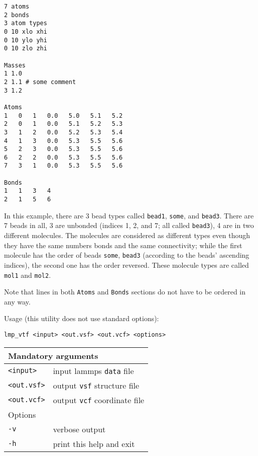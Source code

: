 \begin{verbatim}
7 atoms
2 bonds
3 atom types
0 10 xlo xhi
0 10 ylo yhi
0 10 zlo zhi

Masses
1 1.0
2 1.1 # some comment
3 1.2

Atoms
1   0   1   0.0   5.0   5.1   5.2
2   0   1   0.0   5.1   5.2   5.3
3   1   2   0.0   5.2   5.3   5.4
4   1   3   0.0   5.3   5.5   5.6
5   2   3   0.0   5.3   5.5   5.6
6   2   2   0.0   5.3   5.5   5.6
7   3   1   0.0   5.3   5.5   5.6

Bonds
1   1   3   4
2   1   5   6
\end{verbatim}
In this example, there are 3 bead types called \texttt{bead1},
\texttt{some}, and \texttt{bead3}. There are 7 beads in all, 3 are unbonded
(indices 1, 2, and 7; all called \texttt{bead3}), 4 are in two different
molecules. The molecules are considered as different types even though they
have the same numbers bonds and the same connectivity; while the first
molecule has the order of beads \texttt{some}, \texttt{bead3} (according to
the beads' ascending indices), the second one has the order reversed. These
molecule types are called \texttt{mol1} and \texttt{mol2}.

Note that lines in both \texttt{Atoms} and \texttt{Bonds} sections do not
have to be ordered in any way.

Usage (this utility does not use standard options):

\vspace{1em}
\noindent
\texttt{lmp\_vtf <input> <out.vsf> <out.vcf> <options>}

\noindent
\begin{longtable}{p{}p{}}
  \toprule
  \multicolumn{2}{l}{Mandatory arguments} \\
  \midrule
  \texttt{<input>} & input lammps \texttt{data} file \\
  \texttt{<out.vsf>} & output \texttt{vsf} structure file \\
  \texttt{<out.vcf>} & output \texttt{vcf} coordinate file \\
  \toprule
  \multicolumn{2}{l}{Options}\\
  \midrule
  \texttt{-v} & verbose output\\
  \texttt{-h} & print this help and exit\\
  \bottomrule
\end{longtable}
